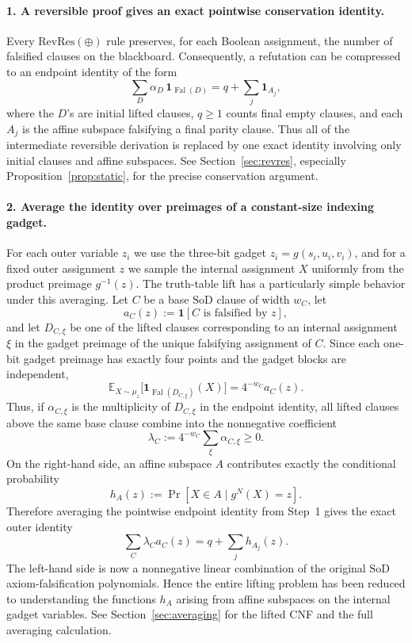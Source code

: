 \documentclass[11pt]{article}
\theoremstyle{definition}
\newcommand{\RevRes}{\mathrm{RevRes}}
\newcommand{\Fal}{\operatorname{Fal}}
\newcommand{\E}{\mathbb E}
\newcommand{\SoD}{\mathrm{SoD}}
\begin{document}
\paragraph{1. A reversible proof gives an exact pointwise conservation identity.}
Every $\RevRes(\oplus)$ rule preserves, for each Boolean assignment, the number of
falsified clauses on the blackboard.  Consequently, a refutation can be compressed to
an endpoint identity of the form
\[
  \sum_D \alpha_D\,\mathbf 1_{\Fal(D)}
  = q+\sum_j \mathbf 1_{A_j},
\]
where the $D$'s are initial lifted clauses, $q\ge1$ counts final empty clauses, and
each $A_j$ is the affine subspace falsifying a final parity clause.  Thus all of the
intermediate reversible derivation is replaced by one exact identity involving only
initial clauses and affine subspaces.  See Section~\ref{sec:revres}, especially
Proposition~\ref{prop:static}, for the precise conservation argument.

\paragraph{2. Average the identity over preimages of a constant-size indexing gadget.}
For each outer variable $z_i$ we use the three-bit gadget
$z_i=g(s_i,u_i,v_i)$, and for a fixed outer assignment $z$ we sample the internal
assignment $X$ uniformly from the product preimage $g^{-1}(z)$.  The truth-table lift
has a particularly simple behavior under this averaging.  Let $C$ be a base $\SoD$
clause of width $w_C$, let
\[
  a_C(z):=\mathbf 1[C\text{ is falsified by }z],
\]
and let $D_{C,\xi}$ be one of the lifted clauses corresponding to an internal assignment
$\xi$ in the gadget preimage of the unique falsifying assignment of $C$.  Since each
one-bit gadget preimage has exactly four points and the gadget blocks are independent,
\[
  \E_{X\sim\mu_z}\bigl[\mathbf 1_{\Fal(D_{C,\xi})}(X)\bigr]
  =4^{-w_C}a_C(z).
\]
Thus, if $\alpha_{C,\xi}$ is the multiplicity of $D_{C,\xi}$ in the endpoint identity,
all lifted clauses above the same base clause combine into the nonnegative coefficient
\[
  \lambda_C:=4^{-w_C}\sum_\xi\alpha_{C,\xi}\ge0.
\]
On the right-hand side, an affine subspace $A$ contributes exactly the conditional
probability
\[
  h_A(z):=\Pr[X\in A\mid g^N(X)=z].
\]
Therefore averaging the pointwise endpoint identity from Step~1 gives the exact outer
identity
\[
  \sum_C\lambda_C a_C(z)
  =q+\sum_j h_{A_j}(z).
\]
The left-hand side is now a nonnegative linear combination of the original $\SoD$
axiom-falsification polynomials.  Hence the entire lifting problem has been reduced to
understanding the functions $h_A$ arising from affine subspaces on the internal gadget
variables.  See Section~\ref{sec:averaging} for the lifted CNF and the full averaging calculation.
\end{document}
